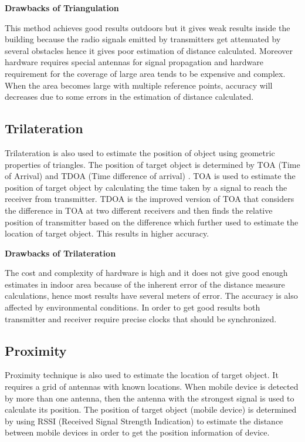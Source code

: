 \textbf{Drawbacks of Triangulation}

This method achieves good results outdoors but it gives weak results inside the building because the radio signals emitted by transmitters get attenuated by several obstacles hence it gives poor estimation of distance calculated. Moreover hardware requires special antennas for signal propagation and hardware requirement for the coverage of large area tends to be expensive and complex\cite{Sakpere2017ASS}. When the area becomes large with multiple reference points, accuracy will decreases due to some errors in the estimation of distance calculated.

\subsection{Trilateration}
Trilateration is also used to estimate the position of object using geometric properties of triangles. The position of target object is determined by TOA (Time of Arrival) and TDOA (Time difference of arrival) \cite{Sakpere2017ASS}. TOA is used to estimate the position of target object by calculating the time taken by a signal to reach the receiver from transmitter. TDOA is the improved version of TOA that considers the difference in TOA at two different receivers and then finds the relative position of transmitter based on the difference which further used to estimate the location of target object. This results in higher accuracy.

\textbf{Drawbacks of Trilateration}

The cost and complexity of hardware is high and it does not give good enough estimates in indoor area because of the inherent error of the distance measure calculations, hence most results have several meters of error\cite{cooper2016loco}. The accuracy is also affected by environmental conditions. In order to get good results both transmitter and receiver require precise clocks that should be synchronized. 

\subsection{Proximity}
Proximity technique is also used to estimate the location of target object. It requires a grid of antennas with known locations. When mobile device is detected by more than one antenna, then the antenna with the strongest signal is used to calculate its position. The position of target object (mobile device) is determined by using RSSI (Received Signal Strength Indication) to estimate the distance between mobile devices in order to get the position information of device.


